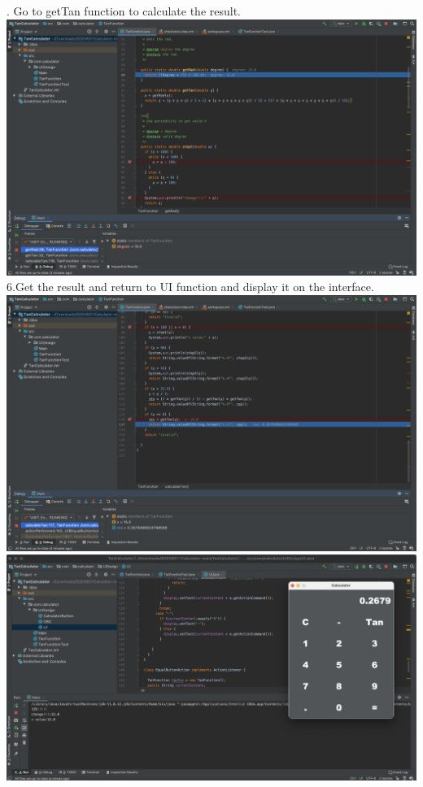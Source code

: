 \documentclass[letterpaper, 11pt]{report}
\begin{document}
. Go to getTan function to calculate the result.\\
\newline
\includegraphics[width=15cm]{step5}\\
\pagebreak
\newpage
6.Get the result and return to UI function and display it on the interface.\\
\newline
\includegraphics[width=15cm]{step6}\\
\newline
\includegraphics[width=15cm]{step7}\\
\pagebreak
\newpage
\end{document}

